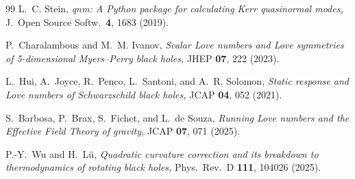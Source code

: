 \documentclass[11pt,a4paper]{article}
\begin{document}
\begin{thebibliography}{99}
L.~C. Stein,
\emph{qnm: A Python package for calculating Kerr quasinormal modes,}
J.\ Open Source Softw.\ \textbf{4}, 1683 (2019).

P.~Charalambous and M.~M. Ivanov,
\emph{Scalar Love numbers and Love symmetries of 5-dimensional
Myers--Perry black holes,}
JHEP \textbf{07}, 222 (2023).

L.~Hui, A.~Joyce, R.~Penco, L.~Santoni, and A.~R. Solomon,
\emph{Static response and Love numbers of Schwarzschild black holes,}
JCAP \textbf{04}, 052 (2021).

S.~Barbosa, P.~Brax, S.~Fichet, and L.~de Souza,
\emph{Running Love numbers and the Effective Field Theory of gravity,}
JCAP \textbf{07}, 071 (2025).

P.-Y.~Wu and H.~L\"u,
\emph{Quadratic curvature correction and its breakdown to thermodynamics
of rotating black holes,}
Phys.\ Rev.\ D \textbf{111}, 104026 (2025).

\end{thebibliography}
\end{document}
